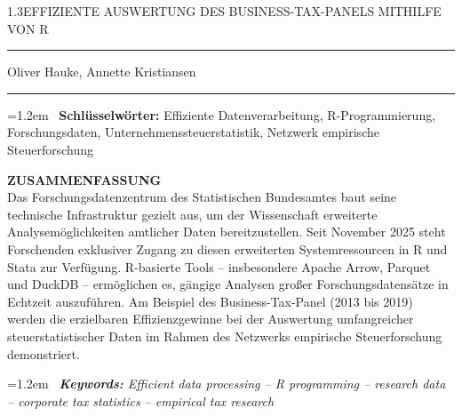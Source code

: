 \begin{titlepage}
\begin{minipage}[t]{11.8cm}
{\LARGE\color{wistaDarkGray}\begin{spacing}{1.3}\MakeUppercase{Effiziente Auswertung des Business-Tax-Panels mithilfe von R}\end{spacing}}

\vspace{-0.2cm}

{\color{wistaBlue}\rule{\linewidth}{0.5pt}}

\vspace{0.5cm}

{\large\color{wistaDarkGray} Oliver Hauke, Annette Kristiansen}

\vspace{0.05cm}

{\color{wistaBlue}\rule{\linewidth}{0.5pt}}

\vspace{0.5cm}

\hangindent=1.2em
{\color{wistaBlue}\ {\bfseries Schlüsselwörter:} Effiziente Datenverarbeitung, R-Programmierung, Forschungsdaten, Unternehmenssteuerstatistik, Netzwerk empirische Steuerforschung}

\vspace{0.3cm}

{\color{wistaDarkGray}\bfseries\MakeUppercase{Zusammenfassung}}\\[0.15cm]
\small
Das Forschungsdatenzentrum des Statistischen Bundesamtes baut seine technische Infrastruktur gezielt aus, um der Wissenschaft erweiterte Analysemöglichkeiten amtlicher Daten bereitzustellen. Seit November 2025 steht Forschenden exklusiver Zugang zu diesen erweiterten Systemressourcen in R und Stata zur Verfügung. R-basierte Tools -- insbesondere Apache Arrow, Parquet und DuckDB -- ermöglichen es, gängige Analysen großer Forschungsdatensätze in Echtzeit auszuführen. Am Beispiel des Business-Tax-Panel (2013 bis 2019) werden die erzielbaren Effizienzgewinne bei der Auswertung umfangreicher steuerstatistischer Daten im Rahmen des Netzwerks empirische Steuerforschung demonstriert.

\vspace{0.5cm}

\hangindent=1.2em
{\itshape\color{wistaBlue}\ {\bfseries Keywords:} Efficient data processing -- R programming -- research data -- corporate tax statistics -- empirical tax research}


\end{minipage}
\end{titlepage}
